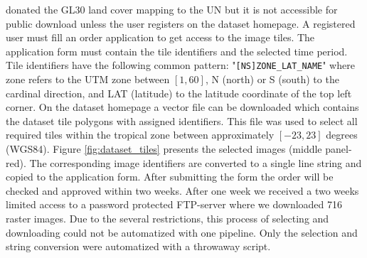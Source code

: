 		\citeauthor{Chen2015} donated the \ac{GL30} land cover mapping to the \ac{UN} but it is not accessible for public download unless the user registers on the dataset homepage. A registered user must fill an order application to get access to the image tiles. The application form must contain the tile identifiers and the selected time period. Tile identifiers have the following common pattern: "\verb|[NS]ZONE_LAT_NAME|" where zone refers to the \ac{UTM} zone between $[1, 60]$, N (north) or S (south) to the cardinal direction, and LAT (latitude) to the latitude coordinate of the top left corner. On the dataset homepage a vector file can be downloaded which contains the dataset tile polygons with assigned identifiers. This file was used to select all required tiles within the tropical zone between approximately $[-23, 23]$ degrees (\ac{WGS84}). Figure \ref{fig:dataset_tiles} presents the selected images (middle panel-red). The corresponding image identifiers are converted to a single line string and copied to the application form. After submitting the form the order will be checked and approved within two weeks. After one week we received a two weeks limited access to a password protected FTP-server where we downloaded 716 raster images. Due to the several restrictions, this process of selecting and downloading could not be automatized with one pipeline. Only the selection and string conversion were automatized with a throwaway script.
